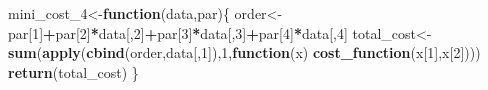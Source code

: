 \documentclass[
]{article}
\newenvironment{Shaded}{\begin{snugshade}}{\end{snugshade}}
\newcommand{\ControlFlowTok}[1]{\textcolor[rgb]{0.13,0.29,0.53}{\textbf{#1}}}
\newcommand{\DecValTok}[1]{\textcolor[rgb]{0.00,0.00,0.81}{#1}}
\newcommand{\KeywordTok}[1]{\textcolor[rgb]{0.13,0.29,0.53}{\textbf{#1}}}
\newcommand{\NormalTok}[1]{#1}
\newcommand{\OperatorTok}[1]{\textcolor[rgb]{0.81,0.36,0.00}{\textbf{#1}}}
\begin{document}
\begin{Shaded}
\begin{Highlighting}[]
\NormalTok{mini_cost_}\DecValTok{4}\NormalTok{<-}\ControlFlowTok{function}\NormalTok{(data,par)\{}
\NormalTok{  order<-par[}\DecValTok{1}\NormalTok{]}\OperatorTok{+}\NormalTok{par[}\DecValTok{2}\NormalTok{]}\OperatorTok{*}\NormalTok{data[,}\DecValTok{2}\NormalTok{]}\OperatorTok{+}\NormalTok{par[}\DecValTok{3}\NormalTok{]}\OperatorTok{*}\NormalTok{data[,}\DecValTok{3}\NormalTok{]}\OperatorTok{+}\NormalTok{par[}\DecValTok{4}\NormalTok{]}\OperatorTok{*}\NormalTok{data[,}\DecValTok{4}\NormalTok{]}
\NormalTok{  total_cost<-}\KeywordTok{sum}\NormalTok{(}\KeywordTok{apply}\NormalTok{(}\KeywordTok{cbind}\NormalTok{(order,data[,}\DecValTok{1}\NormalTok{]),}\DecValTok{1}\NormalTok{,}\ControlFlowTok{function}\NormalTok{(x) }\KeywordTok{cost_function}\NormalTok{(x[}\DecValTok{1}\NormalTok{],x[}\DecValTok{2}\NormalTok{])))}
  \KeywordTok{return}\NormalTok{(total_cost)}
\NormalTok{\}}


\end{Highlighting}
\end{Shaded}
\end{document}
